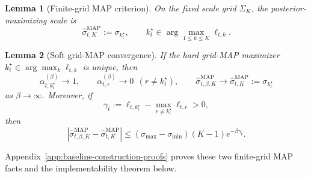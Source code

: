 \documentclass[11pt]{article}
\newtheorem{lemma}{Lemma}
\begin{document}


\clearpage

\begin{lemma}[Finite-grid MAP criterion]
\label{lem:finite-grid-map}
On the fixed scale grid \(\Sigma_K\), the posterior-maximizing scale is
\[
\hat\sigma^{\mathrm{MAP}}_{t,K}:=\sigma_{k_t^\star},
\qquad
k_t^\star\in\arg\max_{1\le k\le K}\ell_{t,k}.
\]
\end{lemma}

\begin{lemma}[Soft grid-MAP convergence]
\label{lem:soft-map-convergence}
If the hard grid-MAP maximizer \(k_t^\star\in\arg\max_k\ell_{t,k}\) is unique, then
\[
\alpha_{t,k_t^\star}^{(\beta)}\to 1,\qquad
\alpha_{t,r}^{(\beta)}\to 0\ \ (r\ne k_t^\star),
\qquad
\hat\sigma^{\mathrm{MAP}}_{t,\beta,K}\to \hat\sigma^{\mathrm{MAP}}_{t,K}:=\sigma_{k_t^\star}
\]
as \(\beta\to\infty\). Moreover, if
\[
\gamma_t:=\ell_{t,k_t^\star}-\max_{r\ne k_t^\star}\ell_{t,r}>0,
\]
then
\[
\left|\hat\sigma^{\mathrm{MAP}}_{t,\beta,K}-\hat\sigma^{\mathrm{MAP}}_{t,K}\right|
\le
(\sigma_{\max}-\sigma_{\min})(K-1)e^{-\beta\gamma_t}.
\]
\end{lemma}

Appendix~\ref{app:baseline-construction-proofs} proves these two finite-grid MAP facts and the implementability theorem below.
\end{document}
